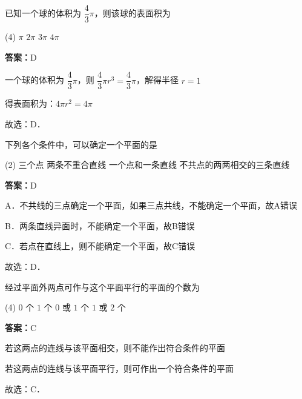 \vspace{2em}

\begin{example}[\bkstar{1}{5}]
已知一个球的体积为 $\dfrac{4}{3}\pi$，则该球的表面积为
\begin{tasks}(4)
    \task $\pi$
    \task $2\pi$
    \task $3\pi$
    \task $4\pi$
\end{tasks}
\end{example}
\begin{solution}
\textbf{答案：}D

一个球的体积为 $\dfrac{4}{3}\pi$，则 $\dfrac{4}{3}\pi r^3=\dfrac{4}{3}\pi$，解得半径 $r=1$

得表面积为：$4\pi r^2=4\pi$

故选：D．
\end{solution}

\vspace{2em}

\begin{example}[\bkstar{1}{5}]
下列各个条件中，可以确定一个平面的是
\begin{tasks}(2)
    \task 三个点
    \task 两条不重合直线
    \task 一个点和一条直线
    \task 不共点的两两相交的三条直线
\end{tasks}
\end{example}
\begin{solution}
\textbf{答案：}D

A．不共线的三点确定一个平面，如果三点共线，不能确定一个平面，故A错误

B．两条直线异面时，不能确定一个平面，故B错误

C．若点在直线上，则不能确定一个平面，故C错误

故选：D．
\end{solution}

\vspace{2em}
\begin{example}[\bkstar{2}{5}]
经过平面外两点可作与这个平面平行的平面的个数为
\begin{tasks}(4)
    \task $0$ 个
    \task $1$ 个
    \task $0$ 或 $1$ 个
    \task $1$ 或 $2$ 个
\end{tasks}
\end{example}
\begin{solution}
\textbf{答案：}C

若这两点的连线与该平面相交，则不能作出符合条件的平面

若这两点的连线与该平面平行，则可作出一个符合条件的平面

故选：C．
\end{solution}


